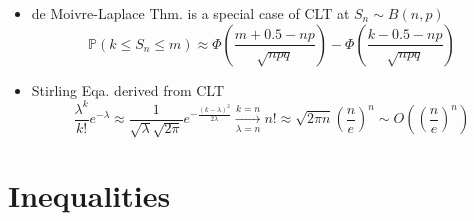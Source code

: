 \begin{itemize}
\begin{proof}
    Define $ Z=\dfrac{X-\mu }{\sigma } $ The taylor series of $ \phi _Z(t) $ at $ t=0 $ yields:
    \begin{align*}
        \phi _Z(t)=1-\dfrac{t^2}{2}+o(t^2) 
    \end{align*}
    The characteristic function of mean $ \displaystyle\bar{Z}:=\dfrac{1}{n}\sum_{i=1}^nZ_i=\dfrac{1}{n}\sum_{i=1}^n\dfrac{X_i-\mu }{\sigma } $ w.r.t. $ X_i $ i.i.d. $ \sim f_X(x) $
    \begin{align*}
        \phi _{\bar{Z}}(t)=\mathbb{E}\left[ e^{it\bar{Z}} \right]=&\left[\phi _{Z}(\dfrac{t}{n})\right]^n=\left[1-\dfrac{t^2}{2n^2}\right] ^n 
    \end{align*}
    with $ n\to\infty $ limit:\footnote{Note: if use characteristic function of $ X_i $ directly, notice that
    \begin{align*}
        n\log\left(1+ \dfrac{at}{n}-\dfrac{bt^2}{2n^2}\right)= at -\left(b+a^2\right)\dfrac{t^2}{2n}+\mathcal{O}(\dfrac{1}{n^2})
    \end{align*}
    using the taylor series of $ \log(1+\xi ) $ at $ \xi =0 $.
    }
    \begin{align*}
        \lim_{n\to\infty}\phi _{\bar{Z}}(t)=&\lim_{n\to\infty} \left[1-\dfrac{1}{n}\dfrac{t^2}{2n}\right] ^n=e^{-\frac{t^2}{2n}} \Rightarrow \bar{Z}=\dfrac{\bar{X}-\mu }{\sigma }\xrightarrow[]{\mathrm{d}} N(0,\dfrac{1}{n})
    \end{align*}

\end{proof}

\item de Moivre-Laplace Thm. is a special case of CLT at $ S_n\sim B (n,p) $
\begin{equation}    \mathbb{P}(k\leq S_n\leq m)\approx \Phi(\frac{m+0.5-np}{\sqrt{npq}})-\Phi(\frac{k-0.5-np}{\sqrt{npq}})
\end{equation}
\item Stirling Eqa. derived from CLT
\begin{equation}    \frac{\lambda^k}{k!}e^{-\lambda}\approx \frac{1}{\sqrt{\lambda}\sqrt{2\pi}}e^{-\frac{(k-\lambda)^2}{2\lambda}}\xrightarrow[\lambda=n]{k=n}n!\approx\sqrt{2\pi n}(\frac{n}{e})^n\sim O\left((\dfrac{n}{e})^n\right)
\end{equation}

\end{itemize}


\section{Inequalities}\label{SubSectionUsefulInequality}
    
